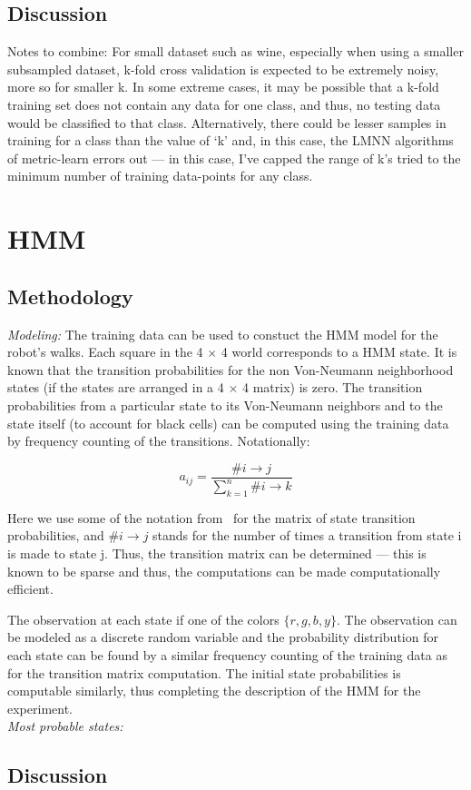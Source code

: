 \documentclass[5pt]{article}
\begin{document}
\subsection{Discussion}
Notes to combine: For small dataset such as wine, especially when using a
smaller subsampled dataset, k-fold cross validation is expected to be extremely
noisy, more so for smaller k. In some extreme cases, it may be possible that a
k-fold training set does not contain any data for one class, and thus, no
testing data would be classified to that class. Alternatively, there could be
lesser samples in training for a class than the value of `k' and, in this case,
the LMNN algorithms of metric-learn errors out --- in this case, I've capped
the range of k's tried to the minimum number of training data-points for any
class.

\section{HMM}
\subsection{Methodology}
\emph{Modeling:} The training data can be used to constuct the HMM model for
the robot's walks.  Each square in the 4 $\times$ 4 world corresponds to a HMM
state. It is known that the transition probabilities for the non Von-Neumann
neighborhood states (if the states are arranged in a 4 $\times$ 4 matrix) is
zero. The transition probabilities from a particular state to its Von-Neumann
neighbors and to the state itself (to account for black cells) can be computed
using the training data by frequency counting of the transitions. Notationally:

\begin{equation}
a_{ij} = \frac{\#i \rightarrow j}{\sum_{k=1}^{n}\#i \rightarrow k}
\end{equation}

Here we use some of the notation from~\cite{rabiner1989tutorial} for the matrix
of state transition probabilities, and $\#i \rightarrow j$ stands for the
number of times a transition from state i is made to state j. Thus, the
transition matrix can be determined --- this is known to be sparse and thus,
the computations can be made computationally efficient.

The observation at each state if one of the colors $\{r, g, b, y\}$. The
observation can be modeled as a discrete random variable and the probability
distribution for each state can be found by a similar frequency counting of the
training data as for the transition matrix computation. The initial state
probabilities is computable similarly, thus completing the description of the
HMM for the experiment. \\

\noindent \emph{Most probable states:}

\subsection{Discussion}

\medskip


\end{document}
